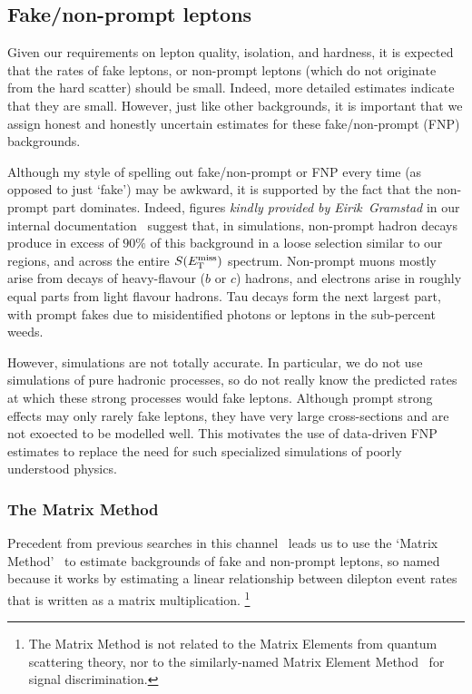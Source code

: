 \subsection{Fake/non-prompt leptons}
\label{sec:2ljets_mm_fakes}
Given our requirements on lepton quality, isolation, and hardness, it is
expected that the rates of fake leptons, or non-prompt leptons (which do not
originate from the hard scatter) should be small.
Indeed, more detailed estimates indicate that they are small.
However, just like other backgrounds, it is important that we assign
honest and honestly uncertain estimates for these fake/non-prompt (FNP)
backgrounds.

Although my style of spelling out fake/non-prompt or FNP every time
(as opposed to just `fake') may be awkward, it is supported by the fact that
the non-prompt part dominates.
Indeed, figures \emph{kindly provided by Eirik~Gramstad} in our internal
documentation~\cite{twoljets2018int} suggest that, in simulations, non-prompt
hadron decays produce in excess of $90\%$ of this background in a loose
selection similar to our regions, and across the entire $S(E_\mathrm{T}^\mathrm{miss})$ spectrum.
Non-prompt muons mostly arise from decays of heavy-flavour ($b$ or $c$)
hadrons, and electrons arise in roughly equal parts from light flavour hadrons.
Tau decays form the next largest part, with prompt fakes due to misidentified
photons or leptons in the sub-percent weeds.

However, simulations are not totally accurate.
In particular, we do not use simulations of pure hadronic processes, so do not
really know the predicted rates at which these strong processes would fake
leptons.
Although prompt strong effects may only rarely fake leptons, they have very
large cross-sections and are not exoected to be modelled well.
This motivates the use of data-driven FNP estimates to replace the need for
such specialized simulations of poorly understood physics.

\subsubsection{The Matrix Method}
\label{sec:2ljets_matrix_method}
Precedent from previous searches in this channel~\cite{
atlas_2l_SUSY_2013_11,
atlas_23l_SUSY_2016_24
}
leads us to use the `Matrix Method'~\cite{
ATLAS-CONF-2014-058,
D0:1999qdf
}
to estimate backgrounds of fake and non-prompt leptons, so named because it
works by estimating a linear relationship between dilepton event rates that is
written as a matrix multiplication.%
\footnote{%
The Matrix Method is not related to the Matrix Elements from quantum scattering
theory, nor to the similarly-named
Matrix Element Method~\cite{Gainer:2013iya} for signal discrimination.%
}

